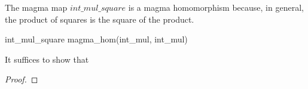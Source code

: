 \documentclass{amsart}
\begin{document}
\begin{example}
The magma map $int\_mul\_square$ is a magma homomorphism because, in general, the product of squares
is the square of the product.

\begin{zed}
	int\_mul\_square \in magma\_hom(int\_mul, int\_mul)
\end{zed}

It suffices to show that


\begin{proof}


\end{proof}

\end{example}
\end{document}
